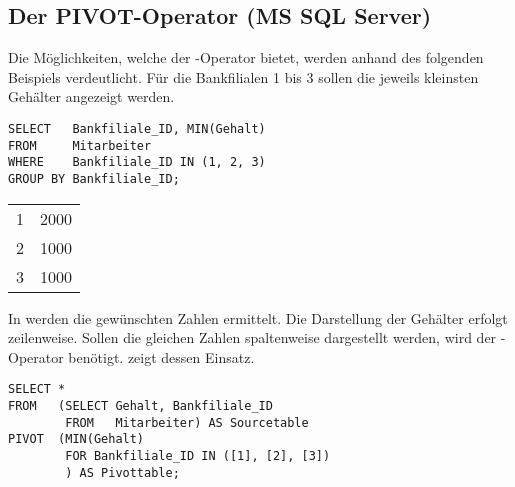 \subsection{Der PIVOT-Operator (MS SQL Server)}
Die Möglichkeiten, welche der -Operator bietet, werden anhand des folgenden Beispiels verdeutlicht. Für die Bankfilialen 1 bis 3 sollen die jeweils kleinsten Gehälter angezeigt werden.
\begin{lstlisting}[language=ms_sql,caption={Die niedrigsten Gehälter in den Filialen 1 bis 3},label=sql06_22]
SELECT   Bankfiliale_ID, MIN(Gehalt)
FROM     Mitarbeiter
WHERE    Bankfiliale_ID IN (1, 2, 3)
GROUP BY Bankfiliale_ID;
        \end{lstlisting}
\clearpage
\begin{center}
    \begin{small}
        \tablehead{}
        \begin{mssql}
            \begin{supertabular}{ll}
                1 & 2000 \\
                2 & 1000 \\
                3 & 1000 \\
            \end{supertabular}
        \end{mssql}
    \end{small}
\end{center}
In  werden die gewünschten Zahlen ermittelt. Die Darstellung der Gehälter erfolgt zeilenweise. Sollen die gleichen Zahlen spaltenweise dargestellt werden, wird der -Operator benötigt.  zeigt dessen Einsatz.
\begin{lstlisting}[language=ms_sql,caption={Das Ergebnis als Pivottabelle},label=sql06_23]
SELECT *
FROM   (SELECT Gehalt, Bankfiliale_ID
        FROM   Mitarbeiter) AS Sourcetable
PIVOT  (MIN(Gehalt)
        FOR Bankfiliale_ID IN ([1], [2], [3])
        ) AS Pivottable;
        \end{lstlisting}
